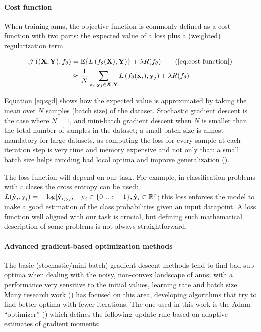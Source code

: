 \documentclass[../main.tex]{subfiles}
\begin{document}
\paragraph{Cost function} When training \glspl{ann}, the objective function is
commonly defined as a cost function with two parts: the expected value of a
loss plus a (weighted) regularization term.

\begin{subequations}\label{eq:cost-function}
\begin{align}
\mathcal{J}\left( (\tensor{X}, \tensor{Y}), f_{\theta} \right) & =
\mathbb{E}\{ L \left( f_{\theta}(\tensor{X}), \tensor{Y} \right) \}
+ \lambda R(f_{\theta}) \tag{\ref{eq:cost-function}}\\
& \approx \frac{1}{N}
\sum_{\tensor{x}_i, \tensor{y}_j \in \tensor{X}, \tensor{Y}}
{L \left( f_{\theta} (\tensor{x}_i), \tensor{y}_j \right)}
+ \lambda R(f_{\theta}) \label{eq:sgd}
\end{align}
\end{subequations}

Equation \eqref{eq:sgd} shows how the expected
value is approximated by taking the mean over $N$ samples (batch size) of the
dataset.
Stochastic gradient descent is the case where $N=1$, and mini-batch
gradient descent when $N$ is smaller than the total number
of samples in the dataset; a small batch size is almost mandatory for large
datasets, as computing the loss for every sample at each iteration step is very
time and memory expensive and not only that: a small batch size helps avoiding
bad local optima and improve generalization
(\cite{DBLP:journals/corr/abs-1804-07612,Zhang2017No0}).

The loss function will depend on our task. For example, in classification
problems with $c$ clases the cross entropy can be used:
$ L(\hat{\mathbf{y}}_i, \text{y}_i) = -\log [\hat{\mathbf{y}}_i]_{\text{y}_i},
\quad \text{y}_i \in \{0\ ..\ c - 1\}, \hat{\mathbf{y}}_i \in \mathbb{R}^{c} $; this
loss enforces the model to make a good estimation of the class probabilities
given an input datapoint.
A loss function well aligned with our task is crucial, but defining such
mathematical description of some problems is not always straightforward.

\paragraph{Advanced gradient-based optimization methods}
The basic (stochastic/mini-batch) gradient descent methods tend to find bad
sub-optima when dealing with the noisy, non-convex landscape of \glspl{ann};
with a performance very sensitive to the initial values, learning rate and
batch size.
Many research work
(\cite{Adagrad,Hinton2012RMSProp,Zeiler2012ADADELTA,Kingma2014Adam})
has focused on this area, developing algorithms that try to
find better optima with fewer iterations. The one used in this work
is the Adam ``optimizer'' (\cite{Kingma2014Adam}) which defines the following
update rule based on adaptive estimates of gradient moments:
\end{document}
